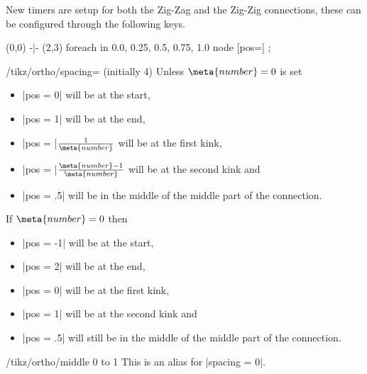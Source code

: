 New timers are setup for both the Zig-Zag and the Zig-Zig connections,
these can be configured through the following keys.
\begin{codeexample}[width=8cm,preamble=\usetikzlibrary{ext.paths.ortho}]
\tikz \draw (0,0) -|- (2,3) 
  foreach \p in {0.0, 0.25, 0.5, 0.75, 1.0}{
    node [pos=\p] {\p}};
\end{codeexample}
\begin{key}{/tikz/ortho/spacing= (initially 4)}
  Unless $\meta{number} = 0$ is set
  \begin{itemize}
  \item |pos = 0| will be at the start,
  \item |pos = 1| will be at the end,
  \item |pos = |$\frac{1}{\meta{number}}$ will be at the first kink,
  \item |pos = |$\frac{\meta{number}-1}{\meta{number}}$ will be at the second kink and
  \item |pos = .5| will be in the middle of the middle part of the connection.
  \end{itemize}
  
  If $\meta{number} = 0$ then
  \begin{itemize}
  \item |pos = -1| will be at the start,
  \item |pos = 2| will be at the end,
  \item |pos = 0| will be at the first kink,
  \item |pos = 1| will be at the second kink and
  \item |pos = .5| will still be in the middle of the middle part of the connection.
  \end{itemize}
\end{key}
\begin{key}{/tikz/ortho/middle 0 to 1}
  This is an alias for |spacing = 0|.
\end{key}


